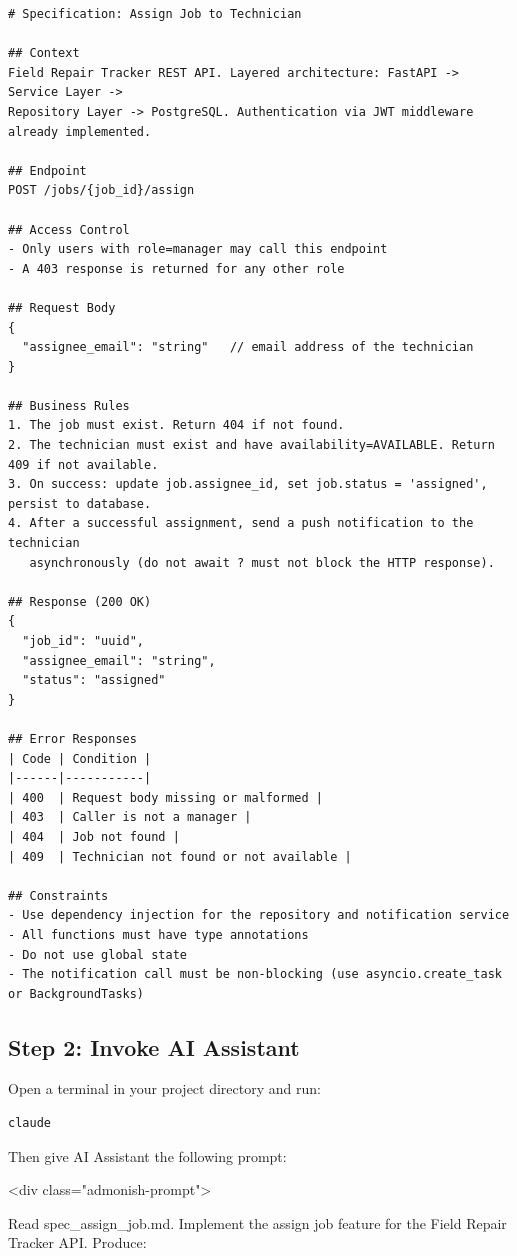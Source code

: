 \documentclass[11pt,a4paper]{book}
\begin{document}
\begin{lstlisting}
# Specification: Assign Job to Technician

## Context
Field Repair Tracker REST API. Layered architecture: FastAPI -> Service Layer -> 
Repository Layer -> PostgreSQL. Authentication via JWT middleware already implemented.

## Endpoint
POST /jobs/{job_id}/assign

## Access Control
- Only users with role=manager may call this endpoint
- A 403 response is returned for any other role

## Request Body
{
  "assignee_email": "string"   // email address of the technician
}

## Business Rules
1. The job must exist. Return 404 if not found.
2. The technician must exist and have availability=AVAILABLE. Return 409 if not available.
3. On success: update job.assignee_id, set job.status = 'assigned', persist to database.
4. After a successful assignment, send a push notification to the technician 
   asynchronously (do not await ? must not block the HTTP response).

## Response (200 OK)
{
  "job_id": "uuid",
  "assignee_email": "string",
  "status": "assigned"
}

## Error Responses
| Code | Condition |
|------|-----------|
| 400  | Request body missing or malformed |
| 403  | Caller is not a manager |
| 404  | Job not found |
| 409  | Technician not found or not available |

## Constraints
- Use dependency injection for the repository and notification service
- All functions must have type annotations
- Do not use global state
- The notification call must be non-blocking (use asyncio.create_task or BackgroundTasks)
\end{lstlisting}

\subsection{Step 2: Invoke AI Assistant}

Open a terminal in your project directory and run:

\begin{lstlisting}[language=Bash]
claude
\end{lstlisting}

Then give AI Assistant the following prompt:

<div class="admonish-prompt">

Read spec\_assign\_job.md. Implement the assign job feature for the Field Repair Tracker API. Produce:
\end{document}
